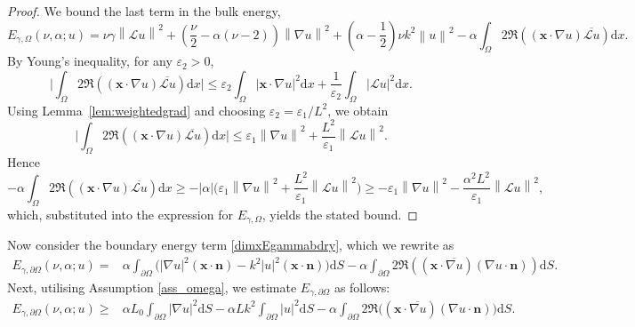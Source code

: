 \documentclass[twoside,11pt]{article}
\def\dimx{\nu }
\def\d{{\mathrm d}}
\def\L{{\mathscr{L}}}
\newcommand{\qp}[1]{\ensuremath{\!\left({#1}\right)}}
\newcommand{\norm}[1]{\ensuremath{\left|#1\right|}}
\newcommand{\Norm}[1]{\ensuremath{\left\|#1\right\|}}
\renewcommand{\vec}[1]{\boldsymbol{#1}}
\def\L{{\mathscr{L}}}
\begin{document}
{\begin{proof}
  We bound the last term in the bulk energy,
  \[
      E_{\gamma,\Omega}(\dimx,\alpha;u)
    =
    \dimx \gamma \Norm{\L u}^2
    +
    \qp{\frac{\dimx}{2} - \alpha (\dimx -2)} \Norm{\nabla u}^2
    +
    \qp{\alpha - \frac{1}{2}}\dimx k^2 \Norm{u}^2
     - 
    \alpha \int_\Omega 2 \Re\qp{(\vec{x}\cdot\nabla u) \overline{\L u}}  \d x.
  \]
  By Young’s inequality, for any $\varepsilon_2>0$,
  \[
    \bigg|\int_\Omega 2 \Re\qp{(\vec{x}\cdot\nabla u) \overline{\L u}}  \d x\bigg|
    \le
    \varepsilon_2 \int_\Omega  \norm{\vec{x}\cdot\nabla u}^2  \d x
    + \frac{1}{\varepsilon_2}\int_\Omega  \norm{\L u}^2  \d x.
  \]
  Using Lemma~\ref{lem:weightedgrad} and choosing {$\varepsilon_2=\varepsilon_1/L^2$}, we obtain
  \[
    \bigg|\int_\Omega 2 \Re\qp{(\vec{x}\cdot\nabla u) \overline{\L u}}  \d x\bigg|
    \le
    \varepsilon_1 \Norm{\nabla u}^2 + \frac{L^2}{\varepsilon_1}\Norm{\L u}^2.
  \]
  Hence
  \[
    - \alpha \int_\Omega 2 \Re\qp{(\vec{x}\cdot\nabla u) \overline{\L u}}  \d x
    \ge
    - |\alpha|\Big(\varepsilon_1 \Norm{\nabla u}^2 + \frac{L^2}{\varepsilon_1}\Norm{\L u}^2\Big)
     \ge 
    - \varepsilon_1 \Norm{\nabla u}^2 - \frac{\alpha^2 L^2}{\varepsilon_1}\Norm{\L u}^2,
  \]
  which, substituted into the expression for $E_{\gamma,\Omega}$, yields the stated bound.
\end{proof}

Now consider the boundary energy term \eqref{dimxEgammabdry}, which we rewrite as
\begin{align}\label{dimxEgamma_boundary}
    E_{\gamma,\partial\Omega}(\dimx,\alpha;u) 
    =&  \alpha \int_{\partial \Omega} \Big(
      \norm{\nabla u}^2  (\vec{x}\cdot\vec{n}) 
      -  k^2 \norm{u}^2  (\vec{x}\cdot\vec{n})
      \Big) \d S  -
    \alpha \int_{\partial \Omega}
      2 \Re\qp{(\vec{x}\cdot\overline{\nabla u}) (\nabla u\cdot\vec{n})}  \d S.
 \end{align}
Next, utilising Assumption \ref{ass_omega}, we estimate $E_{\gamma,\partial \Omega}$ as follows:
\begin{align}\label{dimxEgamma_boundary2}
    E_{\gamma,\partial \Omega}(\dimx,\alpha;u) 
    \ge&  \alpha L_0 \int_{\partial \Omega} |\nabla u|^2  \d S
    -  {\alpha}  L k^2 \int_{\partial \Omega} |u|^2  \d S
    -
    \alpha \int_{\partial \Omega}
      2 \Re \big((\vec{x}\cdot \overline{\nabla u}) (\nabla u\cdot \vec{n})\big)  \d S .
 \end{align}

}
\end{document}
